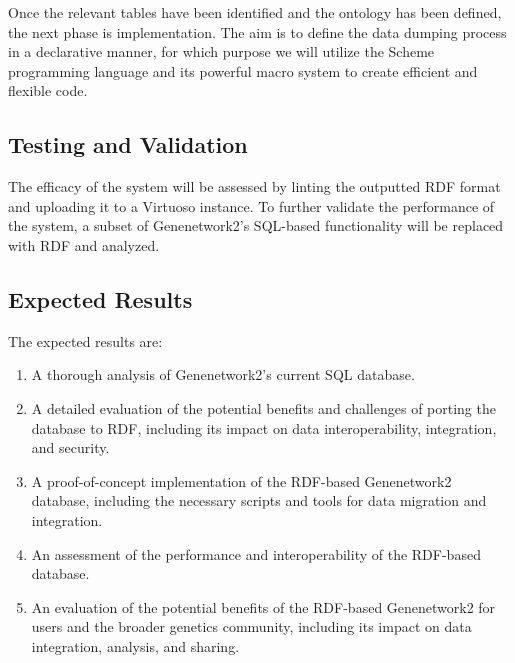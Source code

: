 Once the relevant tables have been identified and the ontology has been defined, the next phase is implementation. The aim is to define the data dumping process in a declarative manner, for which purpose we will utilize the Scheme programming language and its powerful macro system to create efficient and flexible code.

\subsection{Testing and Validation}

The efficacy of the system will be assessed by linting the outputted RDF format and uploading it to a Virtuoso instance. To further validate the performance of the system, a subset of Genenetwork2's SQL-based functionality will be replaced with RDF and analyzed.

\subsection{Expected Results}
The expected results are:

\begin{enumerate}
\item A thorough analysis of Genenetwork2's current SQL database.

\item A detailed evaluation of the potential benefits and challenges of porting the database to RDF, including its impact on data interoperability, integration, and security.

\item A proof-of-concept implementation of the RDF-based Genenetwork2 database, including the necessary scripts and tools for data migration and integration.

\item An assessment of the performance and interoperability of the RDF-based database.

\item An evaluation of the potential benefits of the RDF-based Genenetwork2 for users and the broader genetics community, including its impact on data integration, analysis, and sharing.
\end{enumerate}
